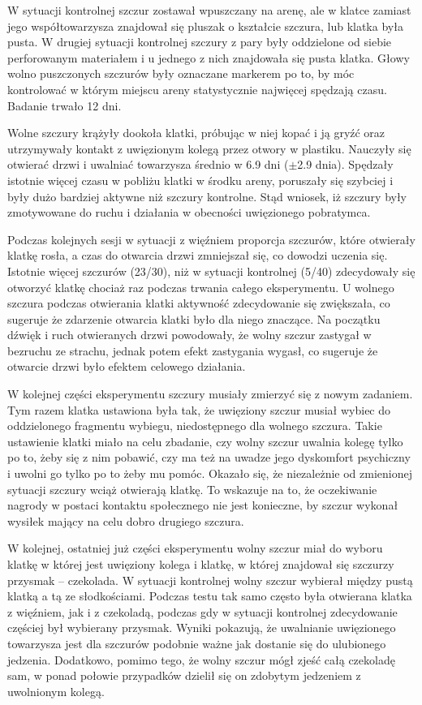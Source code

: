\documentclass[12pt]{article}
\begin{document}
W sytuacji kontrolnej szczur zostawał wpuszczany na arenę, ale w klatce zamiast jego współtowarzysza znajdował się pluszak o kształcie szczura, lub klatka była pusta. W drugiej sytuacji kontrolnej szczury z pary były oddzielone od siebie perforowanym materiałem i u jednego z nich znajdowała się pusta klatka. Głowy wolno puszczonych szczurów były oznaczane markerem po to, by móc kontrolować w którym miejscu areny statystycznie najwięcej spędzają czasu. Badanie trwało 12 dni.

Wolne szczury krążyły dookoła klatki, próbując w niej kopać i ją gryźć oraz utrzymywały kontakt z uwięzionym kolegą przez otwory w plastiku. Nauczyły się otwierać drzwi i uwalniać towarzysza średnio w 6.9 dni ($\pm$2.9 dnia). Spędzały istotnie więcej czasu w pobliżu klatki w środku areny, poruszały się szybciej i były dużo bardziej aktywne niż szczury kontrolne. Stąd wniosek, iż szczury były zmotywowane do ruchu i działania w obecności uwięzionego pobratymca.

Podczas kolejnych sesji w sytuacji z więźniem proporcja szczurów, które otwierały klatkę rosła, a czas do otwarcia drzwi zmniejszał się, co dowodzi uczenia się. Istotnie więcej szczurów (23/30), niż w sytuacji kontrolnej (5/40) zdecydowały się otworzyć klatkę chociaż raz podczas trwania całego eksperymentu. U wolnego szczura podczas otwierania klatki aktywność zdecydowanie się zwiększała, co sugeruje że zdarzenie otwarcia klatki było dla niego znaczące. Na początku dźwięk i ruch otwieranych drzwi powodowały, że wolny szczur zastygał w bezruchu ze strachu, jednak potem efekt zastygania wygasł, co sugeruje że otwarcie drzwi było efektem celowego działania.

W kolejnej części eksperymentu szczury musiały zmierzyć się z nowym zadaniem. Tym razem klatka ustawiona była tak, że uwięziony szczur musiał wybiec do oddzielonego fragmentu wybiegu, niedostępnego dla wolnego szczura. Takie ustawienie klatki miało na celu zbadanie, czy wolny szczur uwalnia kolegę tylko po to, żeby się z nim pobawić, czy ma też na uwadze jego dyskomfort psychiczny i uwolni go tylko po to żeby mu pomóc. Okazało się, że niezależnie od zmienionej sytuacji szczury wciąż otwierają klatkę. To wskazuje na to, że oczekiwanie nagrody w postaci kontaktu społecznego nie jest konieczne, by szczur wykonał wysiłek mający na celu dobro drugiego szczura.

W kolejnej, ostatniej już części eksperymentu wolny szczur miał do wyboru klatkę w której jest uwięziony kolega i klatkę, w której znajdował się szczurzy przysmak -- czekolada. W sytuacji kontrolnej wolny szczur wybierał między pustą klatką a tą ze słodkościami. Podczas testu tak samo często była otwierana klatka z więźniem, jak i z czekoladą, podczas gdy w sytuacji kontrolnej zdecydowanie częściej był wybierany przysmak. Wyniki pokazują, że uwalnianie uwięzionego towarzysza jest dla szczurów podobnie ważne jak dostanie się do ulubionego jedzenia. Dodatkowo, pomimo tego, że wolny szczur mógł zjeść całą czekoladę sam, w ponad połowie przypadków dzielił się on zdobytym jedzeniem z uwolnionym kolegą.
\end{document}
